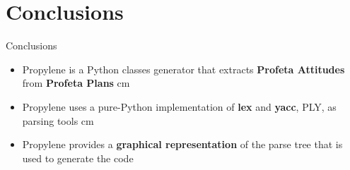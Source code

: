 \documentclass{beamer}
\newcommand{\N}{\vskip 0.3 cm}
\newcommand{\red}[1]{\textcolor[rgb]{.8,0,0}{#1}}
\newcommand{\navy}[1]{\textcolor[rgb]{0,0,.5}{#1}}
\begin{document}
\section{Conclusions}
%
\begin{frame}{Conclusions}
  \begin{itemize}
    \item \navy{Propylene} is a Python classes generator that extracts
    \textbf{Profeta Attitudes} from \textbf{Profeta Plans}
\N
    \item \navy{Propylene} uses a pure-Python implementation of \textbf{lex}
    and \textbf{yacc}, \red{PLY}, as parsing tools
\N
    \item \navy{Propylene} provides a \textbf{graphical representation} 
    of the parse tree that is used to generate the code
  \end{itemize}
\end{frame}
%
%
%
\end{document}

